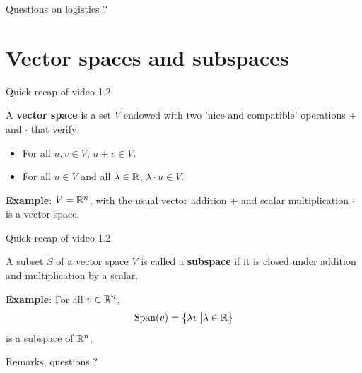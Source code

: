 \documentclass{beamer}
\begin{document}
\begin{frame}[t]{Questions on logistics ?}
	\grid
\end{frame}

\section{Vector spaces and subspaces}

\begin{frame}[t]{Quick recap of video 1.2}
	\grid
	\vspace{-0.7cm}
	\begin{exampleblock}{}
		A \textbf{vector space} is a set $V$ endowed with two 'nice and compatible' operations $+$ and $\cdot$ that verify:
		\begin{itemize}
			\item For all $u,v \in V$, $u+v \in V$.
			\item For all $u \in V$ and all $\lambda \in \mathbb{R}$, $\lambda \cdot u \in V$.
		\end{itemize}
	\end{exampleblock}
	\textbf{Example}: $V = \mathbb{R}^n$, with the usual vector addition $+$ and scalar multiplication $\cdot$ is a vector space.
\end{frame}


\begin{frame}[t]{Quick recap of video 1.2}
	\grid
	\vspace{-0.7cm}
	\begin{exampleblock}{}
		A subset $S$ of a vector space $V$ is called a \textbf{subspace} if it is closed under addition and multiplication by a scalar.
	\end{exampleblock}
	\textbf{Example}: For all $v \in \mathbb{R}^n$, 
	$$
	{{\rm Span}}(v) = \big\{ \lambda v \, \big| \lambda \in \mathbb{R} \big\}
	$$
	is a subspace of $\mathbb{R}^n$.
\end{frame}


\begin{frame}[t]{Remarks, questions ?}
	\grid
	\pause
\end{frame}


\end{document}
